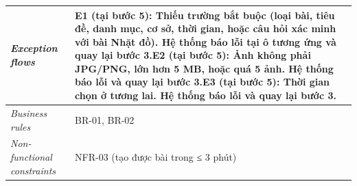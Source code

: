 \begin{longtable}[]{@{}|>{\raggedright\arraybackslash}p{}|>{\raggedright\arraybackslash}p{}|@{}}
\emph{Exception flows} & E1 (tại bước 5): Thiếu trường bắt buộc (loại bài, tiêu đề, danh mục, cơ sở, thời gian, hoặc câu hỏi xác minh với bài Nhặt đồ). Hệ thống báo lỗi tại ô tương ứng và quay lại bước 3.\newline E2 (tại bước 5): Ảnh không phải JPG/PNG, lớn hơn 5 MB, hoặc quá 5 ảnh. Hệ thống báo lỗi và quay lại bước 3.\newline E3 (tại bước 5): Thời gian chọn ở tương lai. Hệ thống báo lỗi và quay lại bước 3. \\ \hline
\emph{Business rules} & BR-01, BR-02 \\ \hline
\emph{Non-functional constraints} & NFR-03 (tạo được bài trong ≤ 3 phút) \\ \hline
\end{longtable}
